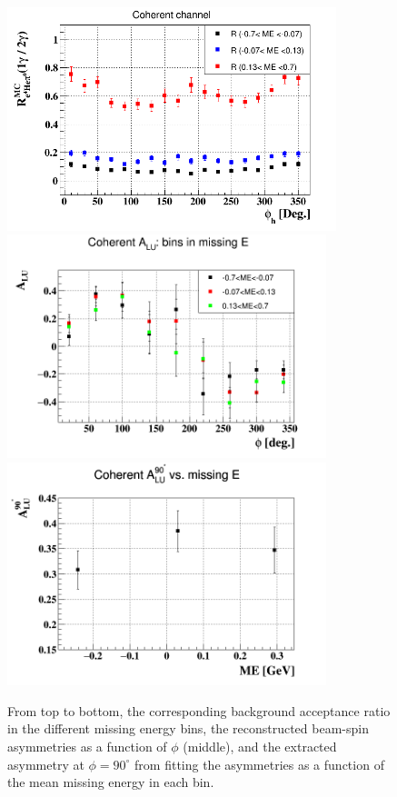 \begin{enumerate}
\begin{enumerate}
    \begin{figure}[tbp]
     \centering
       \includegraphics[height=6.5cm]{fig_new/e4Hegamma_e4Hepi0_Phi_ME.png}
       \includegraphics[height=6.5cm]{fig_new/BSA_coherent_ME.png}
       \includegraphics[height=6.5cm]{fig_new/coh_ME_alpha.png}
   \caption{From top to bottom, the corresponding background acceptance ratio 
in the different missing energy bins, the reconstructed beam-spin asymmetries 
as a function of $\phi$ (middle), and the extracted asymmetry at $\phi = 90 
^{\circ}$ from fitting the asymmetries as a function of the mean missing energy 
in each bin.}
   \label{fig:coherent_ME_bins_2}
    \end{figure}


\end{enumerate}
\end{enumerate}
